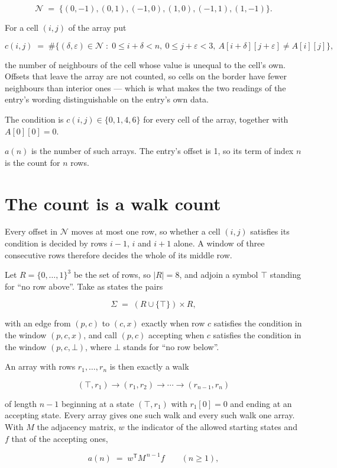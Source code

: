 \documentclass[11pt]{article}
\theoremstyle{definition}
\begin{document}
\[\mathcal{N} \;=\; \{(0,-1), (0,1), (-1,0), (1,0), (-1,1), (1,-1)\}.\]

For a cell $(i,j)$ of the array put

\[c(i,j) \;=\; \#\bigl\{(\delta,\varepsilon)\in\mathcal{N} \;:\; 0\le i+\delta<n,\ 0\le j+\varepsilon<3,\ A[i+\delta][j+\varepsilon] \neq A[i][j]\bigr\},\]

the number of neighbours of the cell whose value is unequal to the cell's own. Offsets that leave the array are not counted, so cells on the border have fewer neighbours than interior ones --- which is what makes the two readings of the entry's wording distinguishable on the entry's own data.

The condition is $c(i,j) \in \{0, 1, 4, 6\}$ for every cell of the array, together with $A[0][0]=0$.

$a(n)$ is the number of such arrays. The entry's offset is 1, so its term of index $n$ is the count for $n$ rows.

\section{The count is a walk count}

Every offset in $\mathcal{N}$ moves at most one row, so whether a cell $(i,j)$ satisfies its condition is decided by rows $i-1$, $i$ and $i+1$ alone. A window of three consecutive rows therefore decides the whole of its middle row.

Let $R = \{0,\dots,1\}^{3}$ be the set of rows, so $|R| = 8$, and adjoin a symbol $\top$ standing for ``no row above''. Take as states the pairs

\[\Sigma \;=\; (R \cup \{\top\}) \times R,\]

with an edge from $(p,c)$ to $(c,x)$ exactly when row $c$ satisfies the condition in the window $(p,c,x)$, and call $(p,c)$ accepting when $c$ satisfies the condition in the window $(p,c,\bot)$, where $\bot$ stands for ``no row below''.

An array with rows $r_1,\dots,r_n$ is then exactly a walk

\[(\top,r_1) \to (r_1,r_2) \to \cdots \to (r_{n-1},r_n)\]

of length $n-1$ beginning at a state $(\top,r_1)$ with $r_1[0]=0$ and ending at an accepting state. Every array gives one such walk and every such walk one array. With $M$ the adjacency matrix, $w$ the indicator of the allowed starting states and $f$ that of the accepting ones,

\[a(n) \;=\; w^{\mathsf T} M^{\,n-1} f \qquad (n \ge 1),\]
\end{document}
